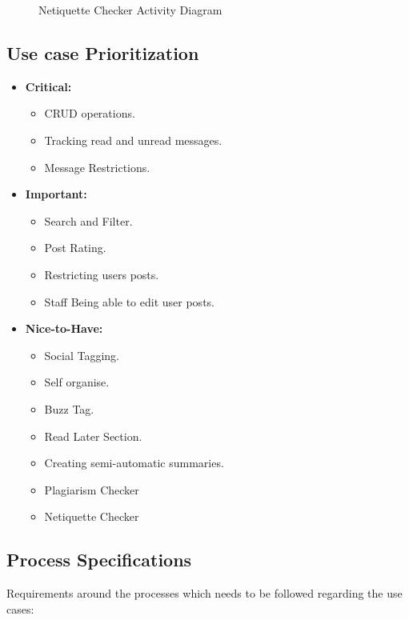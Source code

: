 \documentclass[11pt]{article}
\begin{document}
\begin{enumerate}
\begin{itemize}
\begin{figure}[H]
	  			\caption{Netiquette Checker Activity Diagram}
	  		\end{figure}
	  	\end{itemize}

\end{enumerate}

\subsection{Use case Prioritization}
\begin{itemize}
\item \textbf{Critical: }
	\begin{itemize}
		\item CRUD operations.
		\item Tracking read and unread messages.
		\item Message Restrictions.
	\end{itemize}

\item \textbf{Important: }
	\begin{itemize}
		\item Search and Filter.
		\item Post Rating.
		\item Restricting users posts.
		\item Staff Being able to edit user posts.
	\end{itemize}

\item \textbf{Nice-to-Have: }
	\begin{itemize}
		\item Social Tagging.
		\item Self organise.
		\item Buzz Tag.
		\item Read Later Section.
		\item Creating semi-automatic summaries.
		\item Plagiarism Checker
		\item Netiquette Checker
	\end{itemize}
\end{itemize}


\subsection{Process Specifications}
Requirements around the processes which needs to be followed regarding the use cases: \newline
\end{document}
